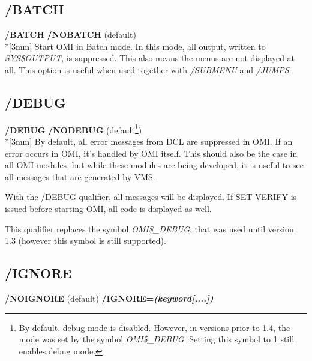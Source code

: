 \documentclass[a4paper]{book}
\newcommand{\vs}{\vspace{3mm}}
\renewcommand{\indent}{\hspace*{5mm}}
\begin{document}
\subsection{/BATCH}
\label{subsubsec:mylabel3}

\vs

\indent\textbf{/BATCH} \newline
\indent\textbf{/NOBATCH} (default)\\*[3mm]
Start OMI in Batch mode. In this mode, all output, written to \textsl{SYS{\$}OUTPUT}, 
is suppressed. This also means the menus are not displayed at all. This 
option is useful when used together with \textsl{/SUBMENU} and \textsl{/JUMPS}.

\subsection{/DEBUG}
\label{subsubsec:mylabel4}

\indent\textbf{/DEBUG} \newline
\indent\textbf{/NODEBUG} (default\footnote{ By default, debug mode is disabled. 
However, in versions prior to 1.4, the mode was set by the symbol 
\textsl{OMI{\$}{\_}DEBUG}. Setting this symbol to 1 still enables debug mode.\par})\\*[3mm]
By default, all error messages from DCL are suppressed in OMI. If an error 
occurs in OMI, it's handled by OMI itself. This should also be the case in 
all OMI modules, but while these modules are being developed, it is useful 
to see all messages that are generated by VMS.

With the /DEBUG qualifier, all messages will be displayed. If \textsf{SET VERIFY}
is issued before starting OMI, all code is displayed as well.

\vs

This qualifier replaces the symbol \textsl{OMI{\$}{\_}DEBUG}, that was used until 
version 1.3 (however this symbol is still supported).

\subsection{/IGNORE}
\label{subsubsec:ignore}
\indent\textbf{/NOIGNORE} (default)\newline
\indent\textbf{/IGNORE=\textit{(keyword[,...])}}
\end{document}
